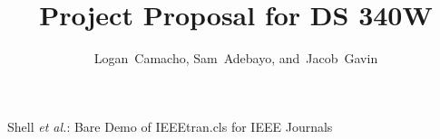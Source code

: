 \documentclass[journal]{IEEEtran}
\begin{document}
%
\title{Project Proposal for DS 340W}
%
%
%

\author{Logan~Camacho,
        Sam~Adebayo,
        and~Jacob~Gavin}%


% 
%



%
{Shell \MakeLowercase{\textit{et al.}}: Bare Demo of IEEEtran.cls for IEEE Journals}
% 
\end{document}
